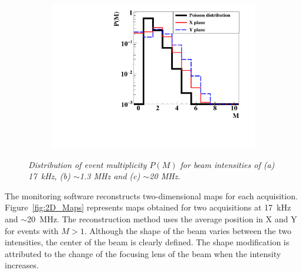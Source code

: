 \documentclass[a4paper,11pt]{article}
\begin{document}
\begin{figure}[htb]
    \begin{subfigure}{0.32\textwidth} \centering \includegraphics[width=\textwidth]{figures/Involved_fibers_20MHz_without_X=0.pdf} \caption{} \label{fig:Fibers_20MHz}
    \end{subfigure}
\caption{\small{\textit{Distribution of event multiplicity $P(M)$ for beam intensities of (a) 17~kHz, (b) $\sim$1.3 MHz and (c) $\sim$20 MHz.}} }
\label{fig:Multiplicity}
\end{figure}

The monitoring software reconstructs two-dimensional maps for each acquisition. Figure~\ref{fig:2D_Maps} represents maps obtained for two acquisitions at 17~kHz and $\sim$20~MHz. The reconstruction method uses the  average position in X and Y for events with $M>1$. Although the shape of the beam varies between the two intensities, the center of the beam is clearly defined. The shape modification is attributed to the change of the focusing lens of the beam when the intensity increases. 
\end{document}
